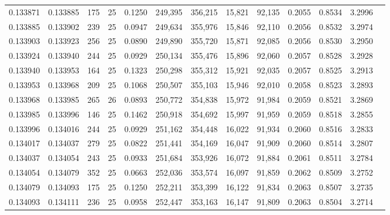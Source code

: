 \begin{tabular}{rrrrrrrrrrrrr}
0.133871 & 0.133885 &   175 &  25 &                                     0.1250 & 249,395 & 356,215 &  15,821 &  92,135 & 0.2055 & 0.8534 & 3.2996 \\
0.133885 & 0.133902 &   239 &  25 &                                     0.0947 & 249,634 & 355,976 &  15,846 &  92,110 & 0.2056 & 0.8532 & 3.2974 \\
0.133903 & 0.133923 &   256 &  25 &                                     0.0890 & 249,890 & 355,720 &  15,871 &  92,085 & 0.2056 & 0.8530 & 3.2950 \\
0.133924 & 0.133940 &   244 &  25 &                                     0.0929 & 250,134 & 355,476 &  15,896 &  92,060 & 0.2057 & 0.8528 & 3.2928 \\
0.133940 & 0.133953 &   164 &  25 &                                     0.1323 & 250,298 & 355,312 &  15,921 &  92,035 & 0.2057 & 0.8525 & 3.2913 \\
0.133953 & 0.133968 &   209 &  25 &                                     0.1068 & 250,507 & 355,103 &  15,946 &  92,010 & 0.2058 & 0.8523 & 3.2893 \\
0.133968 & 0.133985 &   265 &  26 &                                     0.0893 & 250,772 & 354,838 &  15,972 &  91,984 & 0.2059 & 0.8521 & 3.2869 \\
0.133985 & 0.133996 &   146 &  25 &                                     0.1462 & 250,918 & 354,692 &  15,997 &  91,959 & 0.2059 & 0.8518 & 3.2855 \\
0.133996 & 0.134016 &   244 &  25 &                                     0.0929 & 251,162 & 354,448 &  16,022 &  91,934 & 0.2060 & 0.8516 & 3.2833 \\
0.134017 & 0.134037 &   279 &  25 &                                     0.0822 & 251,441 & 354,169 &  16,047 &  91,909 & 0.2060 & 0.8514 & 3.2807 \\
0.134037 & 0.134054 &   243 &  25 &                                     0.0933 & 251,684 & 353,926 &  16,072 &  91,884 & 0.2061 & 0.8511 & 3.2784 \\
0.134054 & 0.134079 &   352 &  25 &                                     0.0663 & 252,036 & 353,574 &  16,097 &  91,859 & 0.2062 & 0.8509 & 3.2752 \\
0.134079 & 0.134093 &   175 &  25 &                                     0.1250 & 252,211 & 353,399 &  16,122 &  91,834 & 0.2063 & 0.8507 & 3.2735 \\
0.134093 & 0.134111 &   236 &  25 &                                     0.0958 & 252,447 & 353,163 &  16,147 &  91,809 & 0.2063 & 0.8504 & 3.2714 \\

\end{tabular}
